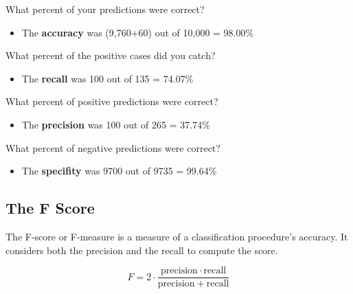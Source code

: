 \documentclass[12pt]{article} %
\begin{document}
What percent of your predictions were correct?

\begin{itemize}
\item The \textbf{accuracy} was (9,760+60) out of 10,000 = 98.00\%
\end{itemize}

What percent of the positive cases did you catch?

\begin{itemize}
\item The \textbf{recall} was 100 out of 135 = 74.07\%
\end{itemize}

What percent of positive predictions were correct?

\begin{itemize}
\item The \textbf{precision} was 100 out of 265 = 37.74\%
\end{itemize}

What percent of negative predictions were correct?

\begin{itemize}
\item The \textbf{specifity} was 9700 out of 9735 = 99.64\%
\end{itemize}

\subsection{The F Score}

The F-score or F-measure is a measure of a classification procedure's accuracy.
It considers both the precision  and the recall to compute the score.

\[ F = 2 \cdot \frac{\mathrm{precision} \cdot \mathrm{recall}}{\mathrm{precision} + \mathrm{recall}}\]

\newpage
\end{document}
